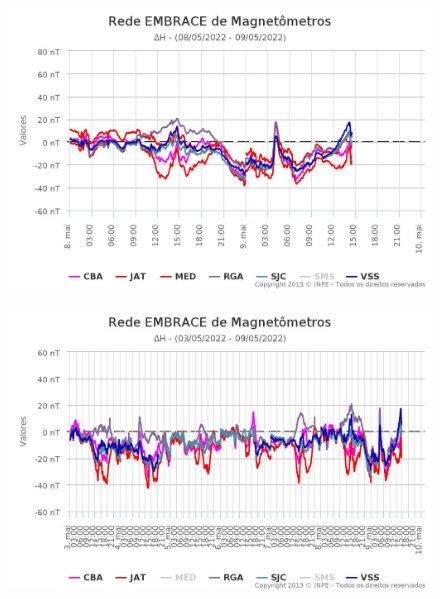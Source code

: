 \documentclass[a4paper, 10pt]{article}
\begin{document}
\begin{figure}[H]
    
                        \centering
   
                             \includegraphics[width=14cm]{./figures//figureGeomag_0.png}

                        \end{figure}

                     \begin{figure}[H]
    
                        \centering
   
                             \includegraphics[width=14cm]{./figures//figureGeomag_1.png}

                        \end{figure}
\end{document}
